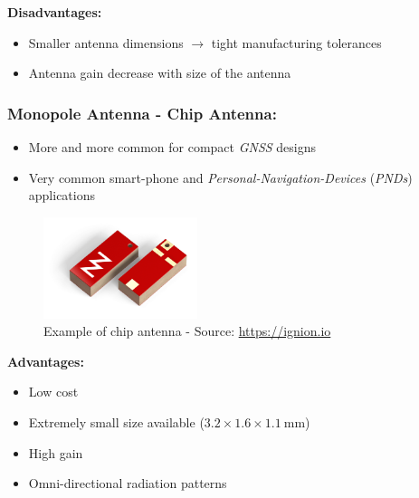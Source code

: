 \documentclass[report.tex]{subfiles}
\begin{document}
\begin{flushleft}
\textbf{Disadvantages:}
\end{flushleft}
\begin{itemize}
\item Smaller antenna dimensions $\rightarrow$ tight manufacturing tolerances
\item Antenna gain decrease with size of the antenna
\end{itemize}

\subsubsection{Monopole Antenna - Chip Antenna:}
\begin{itemize}
\item More and more common for compact \textit{GNSS} designs
\item Very common smart-phone and \textit{Personal-Navigation-Devices }(\textit{PNDs}) applications
\end{itemize}

\begin{figure}[H]
	\centering
	\includegraphics[width=0.4\textwidth]{Include/Figure/antenna/chip_antenna.png}
	\caption{Example of chip antenna - Source: \url{https://ignion.io}}
	\label{fig:chip_antenna}
\end{figure}

\begin{flushleft}
\textbf{Advantages:}
\end{flushleft}
\begin{itemize}
\item Low cost
\item Extremely small size available ($3.2\times 1.6 \times \SI{1.1}{\milli\meter}$)
\item High gain
\item Omni-directional radiation patterns
\end{itemize}
\end{document}
